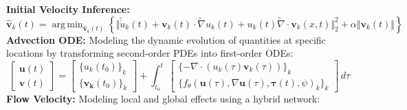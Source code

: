 \documentclass[landscape,a1paper,fontscale=0.424]{baposter}
\DeclareMathOperator*{\argmin}{arg\,min}
\begin{document}
\begin{poster}
{        %
        \textbf{\color{blue}Initial Velocity Inference:}
        \vspace{-0.5em}
        \begin{equation*}
            \hat{\mathbf{v}}_{k}(t) = \argmin_{\hat{\mathbf{v}}_{k}(t)} \left\{ \big\Vert \tilde{\dot{u}}_k(t) + \mathbf{v}_{k}(t) \cdot \tilde{\nabla}u_k(t) + u_k(t) \tilde{\nabla} \cdot \mathbf{v}_k(x,t) \big\Vert_2^2 + \alpha \big\Vert \mathbf{v}_k(t) \big\Vert \right\}
        \end{equation*}
        \textbf{\color{blue}Advection ODE:} Modeling the dynamic evolution of quantities at specific locations by transforming second-order PDEs into first-order ODEs:
        \vspace{-0.5em}
        \begin{equation*}
            \begin{bmatrix}\mathbf{u}(t) \\ \mathbf{v}(t)\end{bmatrix}
            = \begin{bmatrix} \{u_k(t_0)\}_k \\ \{ \mathbf{v_k}(t_0) \}_k \end{bmatrix} + \int_{t_0}^{t} \begin{bmatrix} \{  - \nabla \cdot \left( u_k(\tau)  \mathbf{v}_k(\tau) \right) \}_k \\ \{ f_{\theta}(\mathbf{u}(\tau), \nabla \mathbf{u}(\tau), \mathbf{\tau}(t), \psi)_k  \}_k \end{bmatrix} \,d\tau
        \end{equation*}
        \textbf{\color{blue}Flow Velocity:} Modeling local and global effects using a hybrid network:
        \vspace{-0.5em}
        \begin{equation*}

\end{equation*}}
\end{poster}
\end{document}
